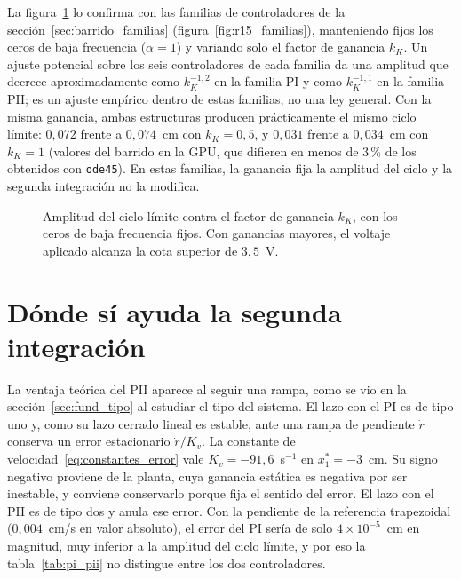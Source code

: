 La figura~\ref{fig:ganancia} lo confirma con las familias de controladores de la sección~\ref{sec:barrido_familias} (figura~\ref{fig:r15_familias}), manteniendo fijos los ceros de baja frecuencia ($\alpha=1$) y variando solo el factor de ganancia $k_K$. Un ajuste potencial sobre los seis controladores de cada familia da una amplitud que decrece aproximadamente como $k_K^{-1{,}2}$ en la familia PI y como $k_K^{-1{,}1}$ en la familia PII; es un ajuste empírico dentro de estas familias, no una ley general. Con la misma ganancia, ambas estructuras producen prácticamente el mismo ciclo límite: $0{,}072$ frente a $0{,}074$~cm con $k_K=0{,}5$, y $0{,}031$ frente a $0{,}034$~cm con $k_K=1$ (valores del barrido en la GPU, que difieren en menos de 3\,\% de los obtenidos con \texttt{ode45}). En estas familias, la ganancia fija la amplitud del ciclo y la segunda integración no la modifica.

\begin{figure}[ht]
    \centering
    
    \caption[Ciclo límite contra la ganancia]{Amplitud del ciclo límite contra el factor de ganancia $k_K$, con los ceros de baja frecuencia fijos. Con ganancias mayores, el voltaje aplicado alcanza la cota superior de $3{,}5$~V.}
    \label{fig:ganancia}
\end{figure}

\section{Dónde sí ayuda la segunda integración}\label{sec:ventaja_rampa}

La ventaja teórica del PII aparece al seguir una rampa, como se vio en la sección~\ref{sec:fund_tipo} al estudiar el tipo del sistema. El lazo con el PI es de tipo uno y, como su lazo cerrado lineal es estable, ante una rampa de pendiente $\dot r$ conserva un error estacionario $\dot r/K_v$. La constante de velocidad~\eqref{eq:constantes_error} vale $K_v=-91{,}6$~s$^{-1}$ en $x_1^*=-3$~cm. Su signo negativo proviene de la planta, cuya ganancia estática es negativa por ser inestable, y conviene conservarlo porque fija el sentido del error. El lazo con el PII es de tipo dos y anula ese error. Con la pendiente de la referencia trapezoidal ($0{,}004$~cm/s en valor absoluto), el error del PI sería de solo $4\times10^{-5}$~cm en magnitud, muy inferior a la amplitud del ciclo límite, y por eso la tabla~\ref{tab:pi_pii} no distingue entre los dos controladores.

